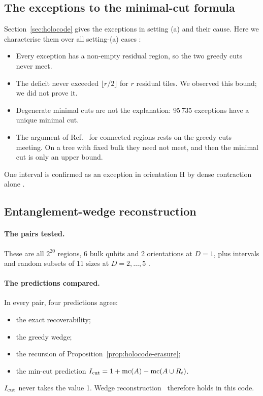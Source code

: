 \subsection{The exceptions to the minimal-cut formula}\label{sec:holocode-rt}

Section~\ref{sec:holocode} gives the exceptions in setting (a) and their cause. Here we characterise them over all setting-(a) cases
:
\begin{itemize}[nosep]
\item Every exception has a non-empty residual region, so the two greedy cuts never meet.
\item The deficit never exceeded $\lfloor r/2\rfloor$ for $r$ residual tiles. We observed this bound; we did not prove it.
\item Degenerate minimal cuts are not the explanation: 95\,735 exceptions have a unique minimal cut.
\item The argument of Ref.~\cite{happy} for connected regions rests on the greedy cuts meeting. On a tree with fixed bulk they need not
  meet, and then the minimal cut is only an upper bound.
\end{itemize}
One interval is confirmed as an exception in orientation H by dense contraction alone .

\subsection{Entanglement-wedge reconstruction}\label{sec:holocode-wedge}

\paragraph{The pairs tested.} These are all $2^{20}$ regions, 6 bulk qubits and 2 orientations at $D=1$, plus intervals and random
subsets of 11 sizes at $D=2,\dots,5$ .

\paragraph{The predictions compared.} In every pair, four predictions agree:
\begin{itemize}[nosep]
\item the exact recoverability;
\item the greedy wedge;
\item the recursion of Proposition~\ref{prop:holocode-erasure};
\item the min-cut prediction $I_{\rm cut}=1+\mathrm{mc}(A)-\mathrm{mc}(A\cup R_t)$.
\end{itemize}
$I_{\rm cut}$ never takes the value 1. Wedge reconstruction~\cite{adh,dong2016} therefore holds in this code.

